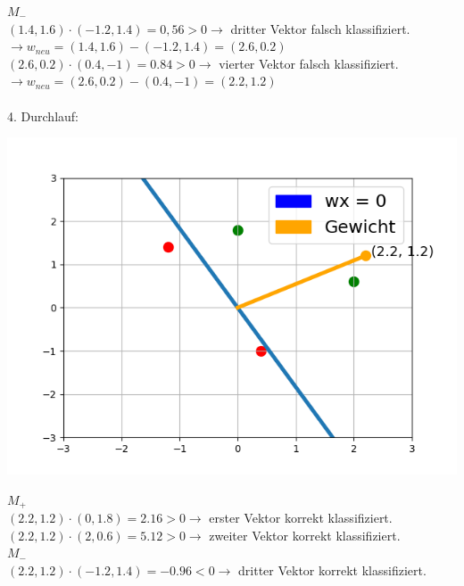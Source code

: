 \documentclass[a4paper]{scrartcl}
\newenvironment{Figure}
  {\par\medskip\noindent\minipage{\linewidth}}
  {\endminipage\par\medskip}
\begin{document}
\begin{multicols}{2}
                        $M_-$\\
                        $(1.4,1.6) \cdot (-1.2,1.4) = 0,56 > 0 \rightarrow$ dritter Vektor falsch klassifiziert.\\
                        $\rightarrow w_{neu} = (1.4,1.6)-(-1.2,1.4) = (2.6,0.2)$\\
                        $(2.6,0.2)\cdot (0.4,-1) = 0.84 > 0 \rightarrow$ vierter Vektor falsch klassifiziert.\\
                        $\rightarrow w_{neu} = (2.6,0.2)-(0.4,-1) = (2.2,1.2)$\\
                        \\
                        4. Durchlauf:\\
                        \begin{Figure}
                            \centering
                            \includegraphics[width=\linewidth]{bsp4.png}
                        \end{Figure}
                        $M_+$\\
                        $(2.2,1.2)\cdot (0,1.8) = 2.16 > 0 \rightarrow$ erster Vektor korrekt klassifiziert.\\
                        $(2.2,1.2)\cdot (2,0.6) = 5.12 > 0 \rightarrow$ zweiter Vektor korrekt klassifiziert.\\
                        $M_-$\\
                        $(2.2,1.2)\cdot (-1.2,1.4) = -0.96 < 0 \rightarrow$ dritter Vektor korrekt klassifiziert.\\

\end{multicols}
\end{document}
